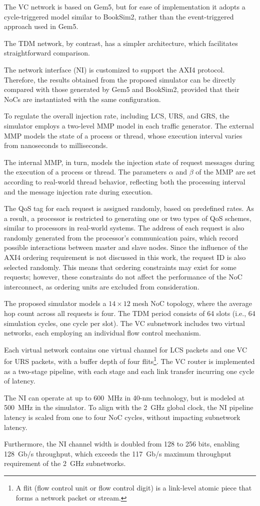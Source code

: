 The VC network is based on Gem5, but for ease of implementation it adopts a cycle-triggered model similar to BookSim2, rather than the event-triggered approach used in Gem5. 

The TDM network, by contrast, has a simpler architecture, which facilitates straightforward comparison. 

The network interface (NI) is customized to support the AXI4 protocol. Therefore, the results obtained from the proposed simulator can be directly compared with those generated by Gem5 and BookSim2, provided that their NoCs are instantiated with the same configuration.

To regulate the overall injection rate, including \ac{LCS}, \ac{URS}, and \ac{GRS}, the simulator employs a two-level \ac{MMP} model in each traffic generator. The external MMP models the state of a process or thread, whose execution interval varies from nanoseconds to milliseconds. 

The internal MMP, in turn, models the injection state of request messages during the execution of a process or thread. The parameters $\alpha$ and $\beta$ of the MMP are set according to real-world thread behavior, reflecting both the processing interval and the message injection rate during execution. 

The QoS tag for each request is assigned randomly, based on predefined rates. As a result, a processor is restricted to generating one or two types of QoS schemes, similar to processors in real-world systems. 
The address of each request is also randomly generated from the processor’s communication pairs, which record possible interactions between master and slave nodes. 
Since the influence of the AXI4 ordering requirement is not discussed in this work, the request ID is also selected randomly. This means that ordering constraints may exist for some requests; however, these constraints do not affect the performance of the NoC interconnect, as ordering units are excluded from consideration.

The proposed simulator models a $14 \times 12$ mesh NoC topology, where the average hop count across all requests is four. The TDM period consists of 64 slots (i.e., 64 simulation cycles, one cycle per slot). The VC subnetwork includes two virtual networks, each employing an individual flow control mechanism.

Each virtual network contains one virtual channel for LCS packets and one VC for URS packets, with a buffer depth of four flits\footnote{A flit (flow control unit or flow control digit) is a link-level atomic piece that forms a network packet or stream.}. The VC router is implemented as a two-stage pipeline, with each stage and each link transfer incurring one cycle of latency. 

The NI can operate at up to 600~MHz in 40-nm technology, but is modeled at 500~MHz in the simulator. To align with the 2~GHz global clock, the NI pipeline latency is scaled from one to four NoC cycles, without impacting subnetwork latency. 

Furthermore, the NI channel width is doubled from 128 to 256 bits, enabling 128~Gb/s throughput, which exceeds the 117~Gb/s maximum throughput requirement of the 2~GHz subnetworks.

